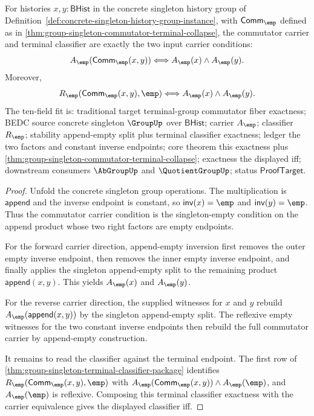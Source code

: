 \begin{theorem}
\label{thm:group-singleton-commutator-carrier-exactness}
For histories $x,y:\mathsf{BHist}$ in the concrete singleton history group of
Definition~\ref{def:concrete-singleton-history-group-instance}, with
$\mathsf{Comm}_{\emp}$ defined as in
\autoref{thm:group-singleton-commutator-terminal-collapse}, the commutator
carrier and terminal classifier are exactly the two input carrier conditions:
$$
A_{\emp}(\mathsf{Comm}_{\emp}(x,y))
\Longleftrightarrow A_{\emp}(x)\land A_{\emp}(y).
$$
Moreover,
$$
R_{\emp}(\mathsf{Comm}_{\emp}(x,y),\emp)
\Longleftrightarrow A_{\emp}(x)\land A_{\emp}(y).
$$
The ten-field fit is: traditional target terminal-group commutator fiber
exactness; BEDC source concrete singleton $\GroupUp$ over $\mathsf{BHist}$;
carrier $A_{\emp}$; classifier $R_{\emp}$; stability append-empty split plus
terminal classifier exactness; ledger the two factors and constant inverse
endpoints; core theorem this exactness plus
\autoref{thm:group-singleton-commutator-terminal-collapse}; exactness the
displayed iff; downstream consumers $\AbGroupUp$ and $\QuotientGroupUp$; status
$\mathsf{ProofTarget}$.
\end{theorem}
\begin{proof}
Unfold the concrete singleton group operations. The multiplication is
$\mathsf{append}$ and the inverse endpoint is constant, so
$\mathsf{inv}(x)=\emp$ and $\mathsf{inv}(y)=\emp$. Thus the commutator carrier
condition is the singleton-empty condition on the append product whose two right
factors are empty endpoints.

For the forward carrier direction, append-empty inversion first removes the
outer empty inverse endpoint, then removes the inner empty inverse endpoint, and
finally applies the singleton append-empty split to the remaining product
$\mathsf{append}(x,y)$. This yields $A_{\emp}(x)$ and $A_{\emp}(y)$.

For the reverse carrier direction, the supplied witnesses for $x$ and $y$
rebuild $A_{\emp}(\mathsf{append}(x,y))$ by the singleton append-empty split.
The reflexive empty witnesses for the two constant inverse endpoints then
rebuild the full commutator carrier by append-empty construction.

It remains to read the classifier against the terminal endpoint. The first row
of \autoref{thm:group-singleton-terminal-classifier-package} identifies
$R_{\emp}(\mathsf{Comm}_{\emp}(x,y),\emp)$ with
$A_{\emp}(\mathsf{Comm}_{\emp}(x,y))\land A_{\emp}(\emp)$, and
$A_{\emp}(\emp)$ is reflexive. Composing this terminal classifier exactness with
the carrier equivalence gives the displayed classifier iff.
\end{proof}

